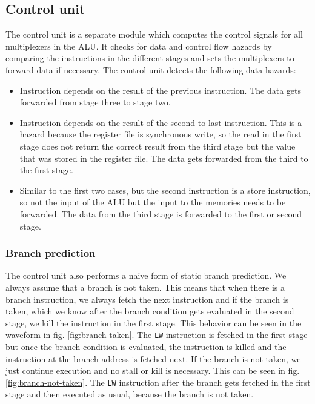 \documentclass[12pt]{article}
\begin{document}
\subsection{Control unit}
\label{sub:control-unit}
The control unit is a separate module which computes the control signals for all multiplexers in the ALU. It checks for data and control flow hazards by comparing the instructions in the different stages and sets the multiplexers to forward data if necessary.
The control unit detects the following data hazards:
\begin{itemize}
\item Instruction depends on the result of the previous instruction. The data gets forwarded from stage three to stage two.
\item Instruction depends on the result of the second to last instruction. This is a hazard because the register file is synchronous write, so the read in the first stage does not return the correct result from the third stage but the value that was stored in the register file. The data gets forwarded from the third to the first stage.
\item Similar to the first two cases, but the second instruction is a store instruction, so not the input of the ALU but the input to the memories needs to be forwarded. The data from the third stage is forwarded to the first or second stage.
\end{itemize}


\subsubsection*{Branch prediction}
The control unit also performs a naive form of static branch prediction. We always assume that a branch is not taken. This means that when there is a branch instruction, we always fetch the next instruction and if the branch is taken, which we know after the branch condition gets evaluated in the second stage, we kill the instruction in the first stage. This behavior can be seen in the waveform in fig. \ref{fig:branch-taken}. The \texttt{LW} instruction is fetched in the first stage but once the branch condition is evaluated, the instruction is killed and the instruction at the branch address is fetched next. If the branch is not taken, we just continue execution and no stall or kill is necessary. This can be seen in fig. \ref{fig:branch-not-taken}. The \texttt{LW} instruction after the branch gets fetched in the first stage and then executed as usual, because the branch is not taken.
\end{document}
